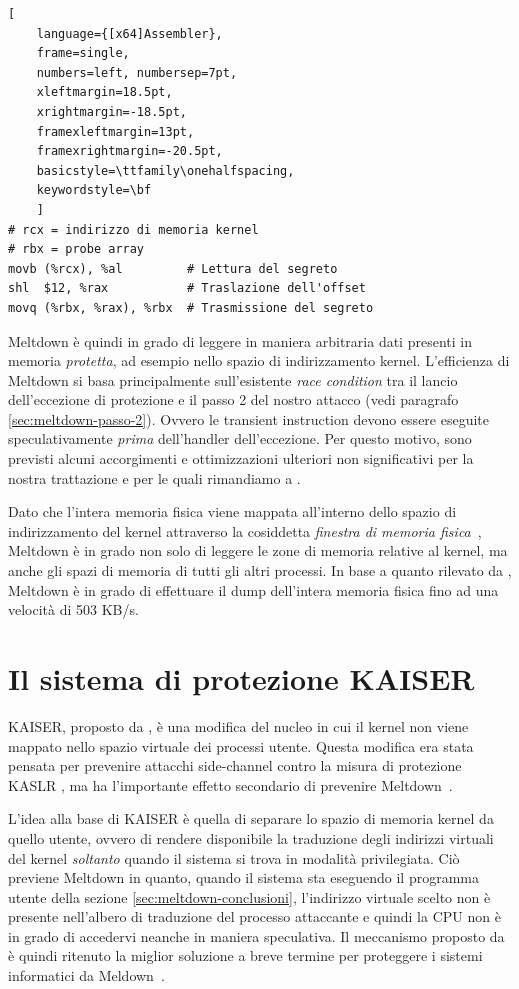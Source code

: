 \begin{lstlisting}[
	language={[x64]Assembler},
	frame=single,
	numbers=left, numbersep=7pt,
	xleftmargin=18.5pt,
	xrightmargin=-18.5pt,
	framexleftmargin=13pt,
	framexrightmargin=-20.5pt,
	basicstyle=\ttfamily\onehalfspacing,
	keywordstyle=\bf
	]
# rcx = indirizzo di memoria kernel
# rbx = probe array
movb (%rcx), %al         # Lettura del segreto
shl  $12, %rax           # Traslazione dell'offset
movq (%rbx, %rax), %rbx  # Trasmissione del segreto
\end{lstlisting} 

Meltdown è quindi in grado di leggere in maniera arbitraria dati presenti in memoria \emph{protetta}, ad esempio nello spazio di indirizzamento kernel. 
L'efficienza di Meltdown si basa principalmente sull'esistente \emph{race condition} tra il lancio dell'eccezione di protezione e il passo 2 del nostro attacco (vedi paragrafo \vref{sec:meltdown-passo-2}). Ovvero le transient instruction devono essere eseguite speculativamente \emph{prima} dell'handler dell'eccezione. Per questo motivo, sono previsti alcuni accorgimenti e ottimizzazioni ulteriori non significativi per la nostra trattazione e per le quali rimandiamo a \textcite{lipp:meltdown}.

Dato che l'intera memoria fisica viene mappata all'interno dello spazio di indirizzamento del kernel attraverso la cosiddetta \emph{finestra di memoria fisica}~\cite{lettieri:paginazione-complementi}, Meltdown è in grado non solo di leggere le zone di memoria relative al kernel, ma anche gli spazi di memoria di tutti gli altri processi. In base a quanto rilevato da \textcite{lipp:meltdown}, Meltdown è in grado di effettuare il dump dell'intera memoria fisica fino ad una velocità di 503 KB/s.

\section{Il sistema di protezione KAISER}
\label{sec:kaiser}
KAISER, proposto da \textcite{gruss:kaslr}, è una modifica del nucleo in cui il kernel non viene mappato nello spazio virtuale dei processi utente.
Questa modifica era stata pensata per prevenire attacchi side-channel contro la misura di protezione KASLR \cite{hund:practical-timing-side-channel, gruss:prefetch-side-channel-attacks, jang:breaking-kaslr}, ma ha l'importante effetto secondario di prevenire Meltdown~\cite{lipp:meltdown}.

L'idea alla base di KAISER è quella di separare lo spazio di memoria kernel da quello utente, ovvero di rendere disponibile la traduzione degli indirizzi virtuali del kernel \emph{soltanto} quando il sistema si trova in modalità privilegiata.
Ciò previene Meltdown in quanto, quando il sistema sta eseguendo il programma utente della sezione \vref{sec:meltdown-conclusioni}, l'indirizzo virtuale scelto non è presente nell'albero di traduzione del processo attaccante e quindi la CPU non è in grado di accedervi neanche in maniera speculativa.
Il meccanismo proposto da \citeauthor{gruss:kaslr} è quindi ritenuto la miglior soluzione a breve termine per proteggere i sistemi informatici da Meldown~\cite{lipp:meltdown}.

